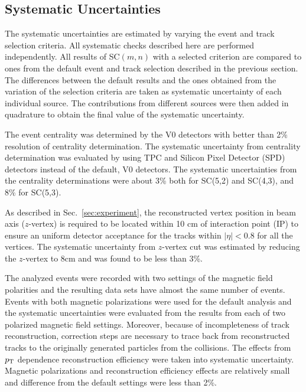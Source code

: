 \subsection{Systematic Uncertainties}
\label{sec:uncertainties}



The systematic uncertainties are estimated by varying the event and track selection criteria. All systematic checks described here are performed independently. 
All results of SC$(m,n)$ with a selected criterion are compared to ones from the default event and track selection described in the previous section.
The differences between the default results and the ones obtained from the variation of the selection criteria are taken as systematic uncertainty of each individual source.
The contributions from different sources were then added in quadrature to obtain the final value of the systematic uncertainty.

The event centrality was determined by the V0 detectors \cite{Abbas:2013taa} with better than 2\%  resolution of centrality determination. The systematic uncertainty from centrality determination was evaluated by using TPC and Silicon Pixel Detector (SPD) \cite{Dellacasa:1999kf} detectors instead of the default, V0 detectors. The systematic uncertainties from the centrality determinations were about 3\% both for SC(5,2) and SC(4,3), and 8\% for  SC(5,3).

As described in Sec.~\ref{sec:experiment}, the reconstructed vertex position in beam axis ($z$-vertex) is required to be located within 10 cm of interaction point (IP) to ensure
an uniform detector acceptance for the tracks within $|\eta|<0.8$ for all the vertices. The systematic uncertainty from $z$-vertex cut was estimated by reducing the $z$-vertex to 8cm and was found to be less than 3\%.  

The analyzed events were recorded with two settings of the magnetic field polarities and the resulting data sets have almost the same number of events. Events with both magnetic polarizations were used for the default analysis and the systematic uncertainties were evaluated from the results from each of two polarized magnetic field settings. 
Moreover, because of incompleteness of track reconstruction, correction steps are necessary to trace back from reconstructed tracks to the originally generated particles from the collisions. The effects from $p_{\rm T}$ dependence reconstruction efficiency were taken into systematic uncertainty. Magnetic polarizations and reconstruction efficiency effects are relatively small and difference from the default settings were less than 2\%.

